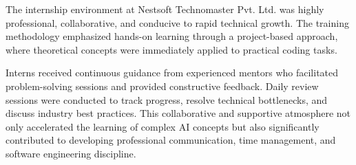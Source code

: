 The internship environment at Nestsoft Technomaster Pvt. Ltd. was highly professional, collaborative, and conducive to rapid technical growth. The training methodology emphasized hands-on learning through a project-based approach, where theoretical concepts were immediately applied to practical coding tasks. 

Interns received continuous guidance from experienced mentors who facilitated problem-solving sessions and provided constructive feedback. Daily review sessions were conducted to track progress, resolve technical bottlenecks, and discuss industry best practices. This collaborative and supportive atmosphere not only accelerated the learning of complex AI concepts but also significantly contributed to developing professional communication, time management, and software engineering discipline.


